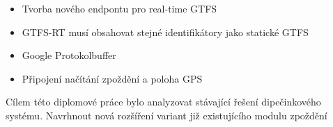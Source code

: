 \begin{itemize}
	\item Tvorba nového endpontu pro real-time GTFS
	\item GTFS-RT musí obsahovat stejné identifikátory jako statické GTFS
	\item Google Protokolbuffer
	\item Připojení načítání zpoždění a poloha GPS
\end{itemize}

Cílem této diplomové práce bylo analyzovat stávající řešení dipečinkového systému. Navrhnout nová rozšíření variant již existujícího modulu zpoždění


